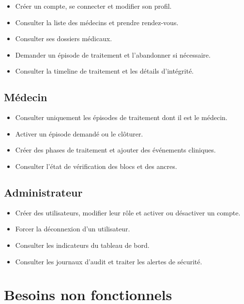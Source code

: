 \begin{itemize}
    \item Créer un compte, se connecter et modifier son profil.
    \item Consulter la liste des médecins et prendre rendez-vous.
    \item Consulter ses dossiers médicaux.
    \item Demander un épisode de traitement et l'abandonner si nécessaire.
    \item Consulter la timeline de traitement et les détails d'intégrité.
\end{itemize}

\subsection{Médecin}

\begin{itemize}
    \item Consulter uniquement les épisodes de traitement dont il est le médecin.
    \item Activer un épisode demandé ou le clôturer.
    \item Créer des phases de traitement et ajouter des événements cliniques.
    \item Consulter l'état de vérification des blocs et des ancres.
\end{itemize}

\subsection{Administrateur}

\begin{itemize}
    \item Créer des utilisateurs, modifier leur rôle et activer ou désactiver un compte.
    \item Forcer la déconnexion d'un utilisateur.
    \item Consulter les indicateurs du tableau de bord.
    \item Consulter les journaux d'audit et traiter les alertes de sécurité.
\end{itemize}

\section{Besoins non fonctionnels}

